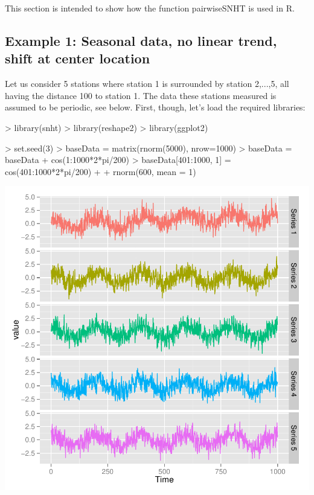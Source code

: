 \documentclass[nojss]{jss}
\begin{document}
This section is intended to show how the function pairwiseSNHT is used in R.

\subsection{Example 1: Seasonal data, no linear trend, shift at center location}

Let us consider 5 stations where station 1 is surrounded by station 2,...,5, all having the distance 100 to station 1. The data these stations measured is assumed to be periodic, see below.  First, though, let's load the required libraries:

\begin{Schunk}
\begin{Sinput}
> library(snht)
> library(reshape2)
> library(ggplot2)
\end{Sinput}
\end{Schunk}

\begin{Schunk}
\begin{Sinput}
> set.seed(3)
> baseData = matrix(rnorm(5000), nrow=1000)
> baseData = baseData + cos(1:1000*2*pi/200)
> baseData[401:1000, 1] = cos(401:1000*2*pi/200) +
+     rnorm(600, mean = 1)
\end{Sinput}
\end{Schunk}
\includegraphics{pairwiseSNHT-005}
\end{document}
